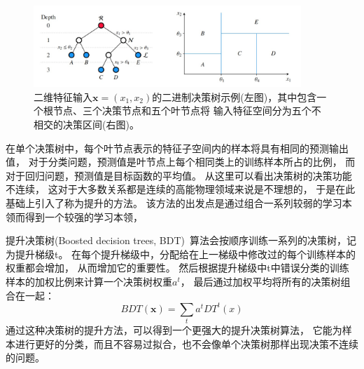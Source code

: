 \begin{figure}
  \begin{center}
    \includegraphics[width=0.9\textwidth]{figuresTHE/BDT.jpg}
  \end{center}
  \caption{二维特征输入$\boldsymbol{x}=(x_1,x_2)$的二进制决策树示例(左图)，其中包含一个根节点、三个决策节点和五个叶节点将
  输入特征空间分为五个不相交的决策区间(右图)。 }
    \label{fig:BDT}
\end{figure}

在单个决策树中，每个叶节点表示的特征子空间内的样本将具有相同的预测输出值，
对于分类问题，预测值是叶节点上每个相同类上的训练样本所占的比例，
而对于回归问题，预测值是目标函数的平均值。
从这里可以看出决策树的决策功能不连续，
这对于大多数关系都是连续的高能物理领域来说是不理想的，
于是在此基础上引入了称为提升的方法。
该方法的出发点是通过组合一系列较弱的学习本领而得到一个较强的学习本领，

提升决策树(Boosted decision trees, BDT)~\cite{BDT3,BDT4}算法会按顺序训练一系列的决策树，记为提升梯级t。
在每个提升梯级中，分配给在上一梯级中修改过的每个训练样本的权重都会增加，
从而增加它的重要性。
然后根据提升梯级中t中错误分类的训练样本的加权比例来计算一个决策树权重$a^t$，
最后通过加权平均将所有的决策树组合在一起：
\begin{equation} 
\label{eq:BDT}
BDT(\boldsymbol{x})=\sum_t a^t DT^t(x) 	
\end{equation}
通过这种决策树的提升方法，可以得到一个更强大的提升决策树算法，
它能为样本进行更好的分类，而且不容易过拟合，也不会像单个决策树那样出现决策不连续的问题。

































